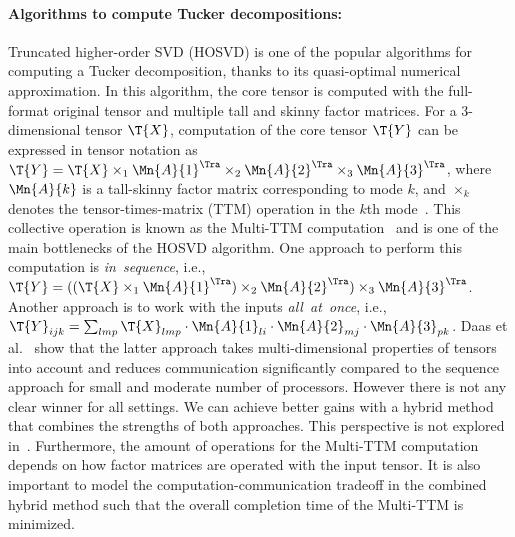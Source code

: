 \documentclass[a4paper,11pt]{article}
\newcommand{\X}{\T{X}}
\newcommand{\Y}{\T{Y}}
\newcommand{\bora}[1]{{\color{magenta} \emph{#1}}}
\begin{document}
	\vspace*{-0.325cm}\paragraph{Algorithms to compute Tucker decompositions:}
	Truncated higher-order SVD (HOSVD) is one of the popular algorithms for computing a Tucker decomposition, thanks to its quasi-optimal numerical approximation. In this algorithm, the core tensor is computed with the full-format original tensor and multiple tall and skinny factor matrices. For a 3-dimensional tensor $\X$, computation of the core tensor $\Y$ can be expressed in tensor notation as $\Y = \X \times_1 {\Mn{A}{1}}^\Tra \times_2 {\Mn{A}{2}}^\Tra \times_3 {\Mn{A}{3}}^\Tra$, where 
	$\Mn{A}{k}$ is a tall-skinny factor matrix corresponding to mode $k$, and $\times_k$ denotes the tensor-times-matrix (TTM) operation in the $k$th mode~\cite{KB-SIAM-2009}. This collective operation is known as the Multi-TTM computation~\cite{ABGKR-SIMAX-2022} and is one of the main bottlenecks of the HOSVD algorithm. One approach to perform this computation is \emph{in~sequence}, i.e., $\Y = ((\X \times_1 {\Mn{A}{1}}^\Tra )\times_2 {\Mn{A}{2}}^\Tra) \times_3 {\Mn{A}{3}}^\Tra$. Another approach is to work with the inputs \emph{all~at~once}, i.e., $\Y_{ijk} = \sum_{lmp}\X_{lmp}\cdot\Mn{A}{1}_{li}\cdot \Mn{A}{2}_{mj}\cdot \Mn{A}{3}_{pk}$.
	Daas et al.~\cite{ABGKR-SIMAX-2022} show that the latter approach takes multi-dimensional properties of tensors into account and reduces communication significantly compared to the sequence approach for small and moderate number of processors. However there is not any clear winner for all settings. We can achieve better gains with a hybrid method that combines the strengths of both approaches. This perspective is not explored in~\cite{ABGKR-SIMAX-2022}.
	Furthermore, the amount of operations for the Multi-TTM computation depends on how factor matrices are operated with the input tensor. It is also important to model the computation-communication tradeoff in the combined hybrid method such that the overall completion time of the Multi-TTM is minimized.
	
	
\end{document}
